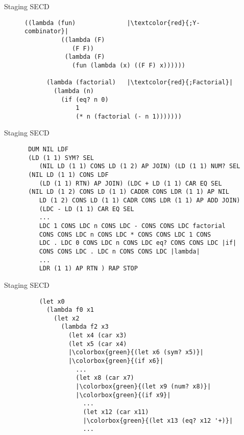 \documentclass{beamer}
\begin{document}
\begin{frame}[fragile]{Staging SECD}
    \begin{figure}
         \begin{verbatim}
((lambda (fun)              |\textcolor{red}{;Y-combinator}|
          ((lambda (F)
             (F F))
           (lambda (F)
             (fun (lambda (x) ((F F) x))))))

      (lambda (factorial)   |\textcolor{red}{;Factorial}|
        (lambda (n)
          (if (eq? n 0)
              1
              (* n (factorial (- n 1)))))))
         \end{verbatim}
    \end{figure}
\end{frame}

\begin{frame}[fragile]{Staging SECD}
    \begin{figure}
         \begin{verbatim}
 DUM NIL LDF
 (LD (1 1) SYM? SEL
    (NIL LD (1 1) CONS LD (1 2) AP JOIN) (LD (1 1) NUM? SEL
 (NIL LD (1 1) CONS LDF
    (LD (1 1) RTN) AP JOIN) (LDC + LD (1 1) CAR EQ SEL
 (NIL LD (1 2) CONS LD (1 1) CADDR CONS LDR (1 1) AP NIL
    LD (1 2) CONS LD (1 1) CADR CONS LDR (1 1) AP ADD JOIN)
    (LDC - LD (1 1) CAR EQ SEL
    ...
    LDC 1 CONS LDC n CONS LDC - CONS CONS LDC factorial
    CONS CONS LDC n CONS LDC * CONS CONS LDC 1 CONS
    LDC . LDC 0 CONS LDC n CONS LDC eq? CONS CONS LDC |if|
    CONS CONS LDC . LDC n CONS CONS LDC |lambda|
    ...
    LDR (1 1) AP RTN ) RAP STOP
         \end{verbatim}
    \end{figure}
\end{frame}

\begin{frame}[fragile]{Staging SECD}
    \begin{figure}
        \begin{verbatim}
    (let x0
      (lambda f0 x1
        (let x2
          (lambda f2 x3
            (let x4 (car x3)
            (let x5 (car x4)
            |\colorbox{green}{(let x6 (sym? x5)}|
            |\colorbox{green}{(if x6}|
              ...
              (let x8 (car x7)
              |\colorbox{green}{(let x9 (num? x8)}|
              |\colorbox{green}{(if x9}|
                ...
                (let x12 (car x11)
                |\colorbox{green}{(let x13 (eq? x12 '+)}|
                ...
        \end{verbatim}
    \end{figure}
\end{frame}
\end{document}
